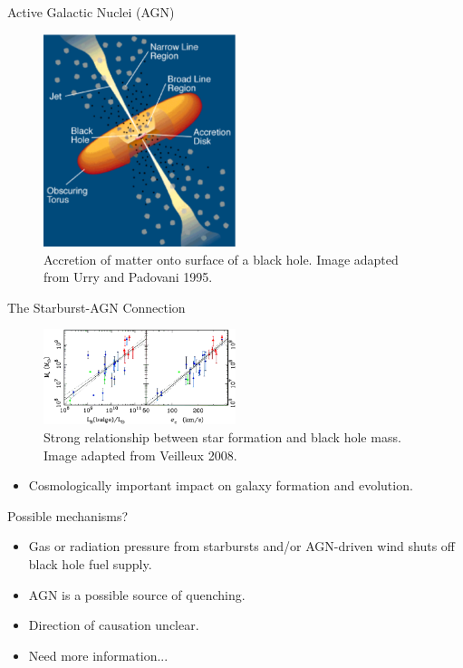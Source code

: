 \documentclass{beamer}
\begin{document}
\begin{frame}{Active Galactic Nuclei (AGN)}
  \begin{figure}
    \centering
    \includegraphics[width=0.5\textwidth]{agn_model}
    \caption{Accretion of matter onto surface of a black hole. Image adapted from Urry and Padovani 1995.}
  \end{figure}
\end{frame}

\begin{frame}{The Starburst-AGN Connection}
  \begin{figure}
    \centering
    \includegraphics[width=0.5\textwidth]{image--002}
    \caption{Strong relationship between star formation and black hole mass. Image adapted from Veilleux 2008.}
  \end{figure}
  \begin{itemize}
    \item Cosmologically important impact on galaxy formation and evolution.
  \end{itemize}
\end{frame}

\begin{frame}{Possible mechanisms?}
  \begin{itemize}
    \item Gas or radiation pressure from starbursts and/or AGN-driven wind shuts off  black hole fuel supply.
    \item AGN is a possible source of quenching.
    \item Direction of causation unclear.
    \item Need more information...
  \end{itemize}
\end{frame}
\end{document}
